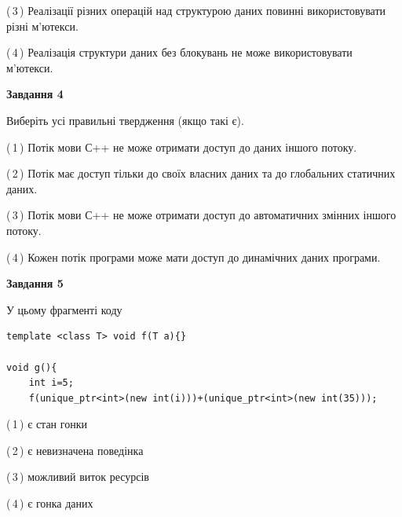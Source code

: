 \documentclass[12pt, ukrainian]{article}
\begin{document}
\begin {large}
{(\,3\,) Реалізації різних операцій над структурою даних повинні використовувати різні м’ютекси.%

(\,4\,) Реалізація структури даних без блокувань не може використовувати м’ютекси.%



\begin{center}
\textbf{Завдання 4}
\end{center}
Виберіть усі правильні твердження (якщо такі є).\par
\vspace{2mm}

(\,1\,) Потік мови С++ не може отримати доступ до даних іншого потоку.%

(\,2\,) Потік має доступ тільки до своїх власних даних та до глобальних статичних даних.%

(\,3\,) Потік мови С++ не може отримати доступ до автоматичних змінних іншого потоку.%

(\,4\,) Кожен потік програми може мати доступ до динамічних даних програми.%



\begin{center}
\textbf{Завдання 5}
\end{center}
У цьому фрагменті коду
\begin{verbatim}
template <class T> void f(T a){}

void g(){
    int i=5;
    f(unique_ptr<int>(new int(i)))+(unique_ptr<int>(new int(35)));
\end{verbatim}
(\,1\,) є стан гонки%

(\,2\,) є невизначена поведінка%

(\,3\,) можливий виток ресурсів%

(\,4\,) є гонка даних%


}
\end {large}
\end{document}

